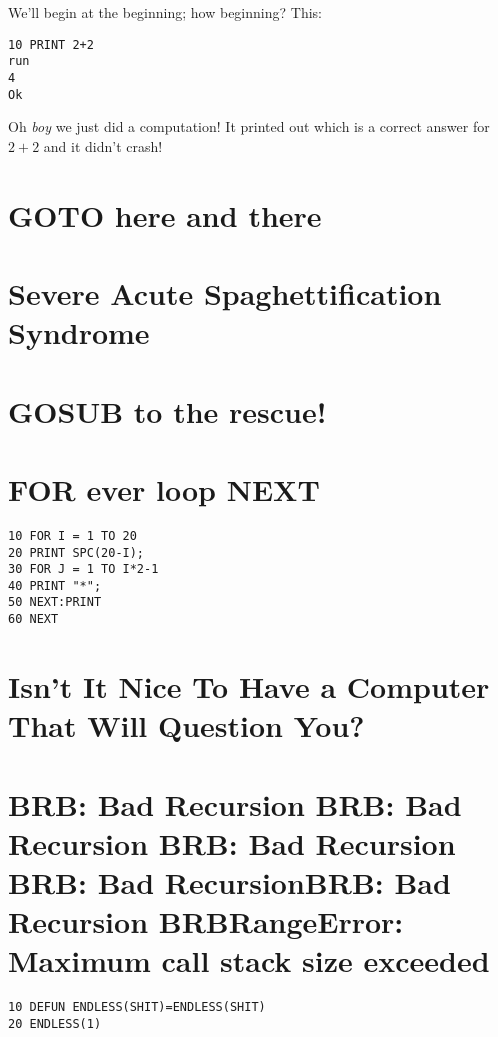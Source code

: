 \quad
{}

We'll begin at the beginning; how beginning? This:

\begin{lstlisting}
10 PRINT 2+2
run
4
Ok
\end{lstlisting}

Oh \emph{boy} we just did a computation! It printed out  which is a correct answer for $2+2$ and it didn't crash!

\section[GOTO]{GOTO here and there}
\section[When GOTO Is Bad]{Severe Acute Spaghettification Syndrome}
\section[Subroutine with GOSUB]{GOSUB to the rescue!}

\section[FOR-NEXT Loop]{FOR ever loop NEXT}

\begin{lstlisting}
10 FOR I = 1 TO 20
20 PRINT SPC(20-I);
30 FOR J = 1 TO I*2-1
40 PRINT "*";
50 NEXT:PRINT
60 NEXT
\end{lstlisting}

\section[Get User INPUT]{Isn't It Nice To Have a Computer That Will Question You?}

\section[Recursion]{BRB: Bad Recursion BRB: Bad Recursion BRB: Bad Recursion BRB: Bad RecursionBRB: Bad Recursion BRBRangeError: Maximum call stack size exceeded}

\begin{lstlisting}
10 DEFUN ENDLESS(SHIT)=ENDLESS(SHIT)
20 ENDLESS(1)
\end{lstlisting}

